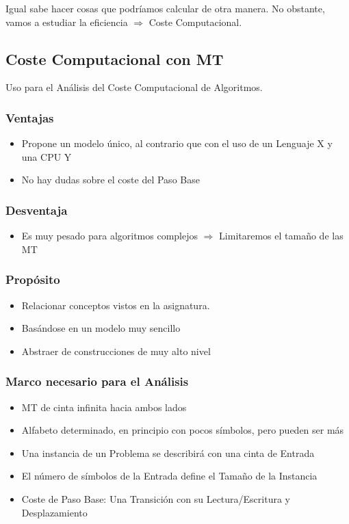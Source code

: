 Igual sabe hacer cosas que podríamos calcular de otra manera. No obstante, vamos a estudiar la eficiencia $\Rightarrow$ Coste Computacional.
\pagebreak

\subsection{Coste Computacional con MT}
Uso para el Análisis del Coste Computacional de Algoritmos.

\subsubsection{Ventajas}
\begin{itemize}
	\item Propone un modelo único, al contrario que con el uso de un Lenguaje X y una CPU Y
	\item No hay dudas sobre el coste del Paso Base
\end{itemize}

\subsubsection{Desventaja}
\begin{itemize}
	\item Es muy pesado para algoritmos complejos $\Rightarrow$ Limitaremos el tamaño de las MT
\end{itemize}

\subsubsection{Propósito}
\begin{itemize}
	\item Relacionar conceptos vistos en la asignatura.
	\item Basándose en un modelo muy sencillo
	\item Abstraer de construcciones de muy alto nivel
\end{itemize}

\subsubsection{Marco necesario para el Análisis}
\begin{itemize}
	\item MT de cinta infinita hacia ambos lados
	\item Alfabeto determinado, en principio con pocos símbolos, pero pueden ser más
	\item Una instancia de un Problema se describirá con una cinta de Entrada
	\item El número de símbolos de la Entrada define el Tamaño de la Instancia
	\item Coste de Paso Base: Una Transición con su Lectura/Escritura y Desplazamiento
\end{itemize}

